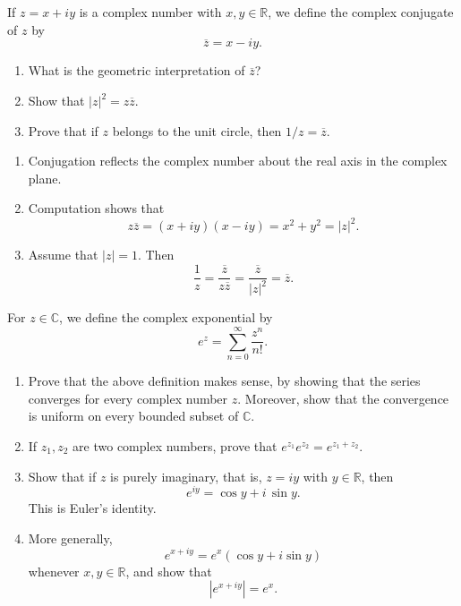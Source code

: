 \documentclass[12pt,letterpaper,boxed]{jhwhw}
\newcommand{\C}{{\mathbb{C}}}
\newcommand{\R}{{\mathbb{R}}}
\newcommand{\abs}[1]{\left| #1 \right|}
\newcommand{\conj}[1]{{\overline{#1}}}
\begin{document}
If $z = x + iy$ is a complex number with $x, y \in \R$, we define the complex conjugate of $z$ by
\[
	\conj{z} = x - iy.
\]

\begin{enumerate}
	\item What is the geometric interpretation of $\conj{z}$?
	\item Show that $\abs{z}^2 = z \conj{z}$.
	\item Prove that if $z$ belongs to the unit circle, then $1/z = \conj{z}$.
\end{enumerate}

\solution
\begin{enumerate}
	\item Conjugation reflects the complex number about the real axis in the complex plane.
	\item Computation shows that
		\[
			z \conj{z} = (x + iy)(x - iy) = x^2 + y^2 = \abs{z}^2.
		\]
	\item Assume that $\abs{z} = 1$. Then
		\[
			\frac{1}{z} = \frac{\conj{z}}{z \conj{z}} = \frac{\conj{z}}{\abs{z}^2} = \conj{z}.
		\]
\end{enumerate}

For $z \in \C$, we define the complex exponential by
\[
	e^z = \sum_{n = 0}^\infty \frac{z^n}{n!}.
\]

\begin{enumerate}
	\item Prove that the above definition makes sense, by showing that the series converges for every complex number $z$. Moreover, show that the convergence is uniform on every bounded subset of $\C$.
	\item If $z_1, z_2$ are two complex numbers, prove that $e^{z_1} e^{z_2} = e^{z_1 + z_2}$.
	\item Show that if $z$ is purely imaginary, that is, $z = iy$ with $y \in \R$, then
		\[
			e^{iy} = \cos y + i \, \sin y.
		\]
	      This is Euler's identity.
	\item More generally,
		\[
			e^{x + iy} = e^x (\cos y + i \sin y)
		\]
	      whenever $x, y \in \R$, and show that
	      \[
		      \abs{e^{x + iy}} = e^x.
	      \]
\end{enumerate}
\end{document}
